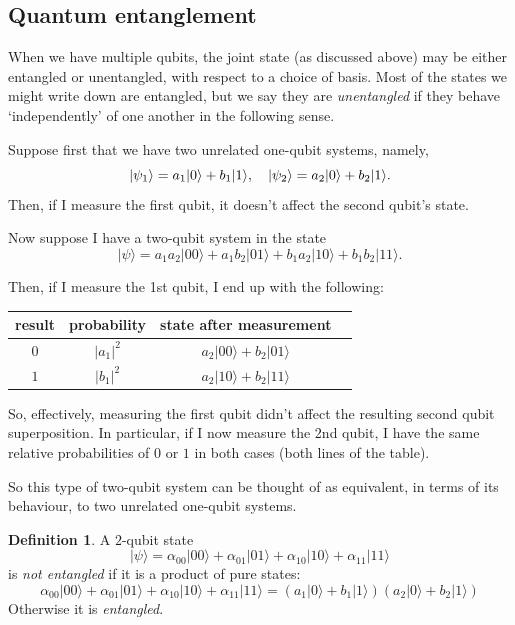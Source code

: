 \documentclass{article}
\theoremstyle{plain}
\theoremstyle{definition}
\newtheorem{definition}[theorem]{Definition}
\theoremstyle{remark}
\numberwithin{theorem}{section}
\begin{document}
\subsection{Quantum entanglement}

When we have multiple qubits, the joint state (as discussed above) may be either entangled or unentangled, with respect to a choice of basis.  Most of the states we might write down are entangled, but we say they are \emph{unentangled} if they behave `independently' of one another in the following sense.

Suppose first that we have two unrelated one-qubit systems, namely,
\[
|\psi_1\rangle = a_1 |0 \rangle + b_1 |1\rangle, \quad
|\psi_2\rangle = a_2 |0 \rangle + b_2 |1\rangle.
\]
Then, if I measure the first qubit, it doesn't affect the second qubit's state.

Now suppose I have a two-qubit system in the state
\[
|\psi \rangle =
a_1a_2 |00\rangle+
a_1b_2 |01\rangle+
b_1a_2 |10\rangle+
b_1b_2 |11\rangle.
\]

Then, if I measure the 1st qubit, I end up with the following:
\vspace{1em}

\begin{center}

\begin{tabular}{cccc}
result & probability & state after measurement \\
\hline
$0$ & $|a_1|^2$ & $a_2|00 \rangle + b_2|01\rangle$ \\
$1$ & $|b_1|^2$ & $a_2|10 \rangle + b_2|11\rangle$ \\
\end{tabular}

\end{center}
\vspace{1em}

So, effectively, measuring the first qubit didn't affect the resulting second qubit superposition.  In particular, if I now measure the 2nd qubit, I have the same relative probabilities of $0$ or $1$ in both cases (both lines of the table).

So this type of two-qubit system can be thought of as equivalent, in terms of its behaviour, to two unrelated one-qubit systems.

\begin{definition}
    A $2$-qubit state
\[
|\psi \rangle =
\alpha_{00} |00\rangle+
\alpha_{01} |01\rangle+
\alpha_{10} |10\rangle+
\alpha_{11} |11\rangle
\]
is \emph{not entangled} if it is a product of pure states:
\[
\alpha_{00} |00\rangle+
\alpha_{01} |01\rangle+
\alpha_{10} |10\rangle+
\alpha_{11} |11\rangle
=
\left(
a_1|0\rangle + b_1|1\rangle
\right)
\left(
a_2|0\rangle + b_2|1\rangle
\right)
\]
Otherwise it is \emph{entangled}.
\end{definition}
\end{document}
